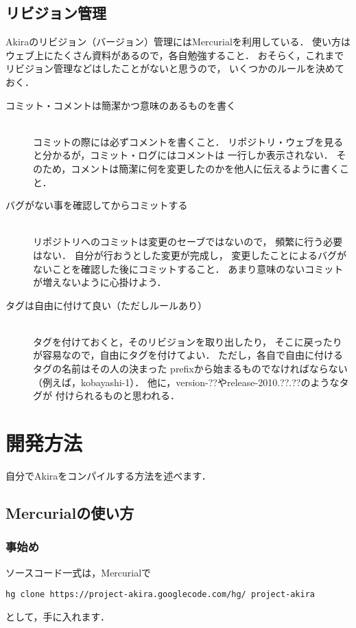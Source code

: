 \documentclass[a4j,openany]{jbook}
\begin{document}
  \section{リビジョン管理}
  Akiraのリビジョン（バージョン）管理にはMercurialを利用している．
  使い方はウェブ上にたくさん資料があるので，各自勉強すること．
  おそらく，これまでリビジョン管理などはしたことがないと思うので，
  いくつかのルールを決めておく．
  \begin{description}
   \item[コミット・コメントは簡潔かつ意味のあるものを書く] \mbox{} \\
              コミットの際には必ずコメントを書くこと．
              リポジトリ・ウェブを見ると分かるが，コミット・ログにはコメントは
              一行しか表示されない．
              そのため，コメントは簡潔に何を変更したのかを他人に伝えるように書くこと．
   \item[バグがない事を確認してからコミットする] \mbox{} \\
              リポジトリへのコミットは変更のセーブではないので，
              頻繁に行う必要はない．
              自分が行おうとした変更が完成し，
              変更したことによるバグがないことを確認した後にコミットすること．
              あまり意味のないコミットが増えないように心掛けよう．
   \item[タグは自由に付けて良い（ただしルールあり）] \mbox{} \\
              タグを付けておくと，そのリビジョンを取り出したり，
              そこに戻ったりが容易なので，自由にタグを付けてよい．
              ただし，各自で自由に付けるタグの名前はその人の決まった
              prefixから始まるものでなければならない（例えば，kobayashi-1）．
              他に，version-??やrelease-2010.??.??のようなタグが
              付けられるものと思われる．
  \end{description}



\chapter{開発方法}
自分でAkiraをコンパイルする方法を述べます．
 \section{Mercurialの使い方}
  \subsection{事始め}
  ソースコード一式は，Mercurialで
 \begin{screen}
\begin{verbatim}
hg clone https://project-akira.googlecode.com/hg/ project-akira
\end{verbatim}
 \end{screen}
 として，手に入れます．
\end{document}
